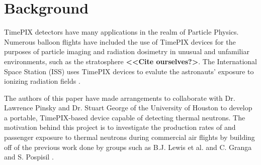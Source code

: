 
\section{Background}
\label{Background}

TimePIX detectors have many applications in the realm of Particle Physics. Numerous balloon flights have included the use of TimePIX devices for the purposes of particle imaging and radiation dosimetry in unusual and unfamiliar environments, such as the stratosphere \cite{bexus} \textbf{<<Cite ourselves?>}. The International Space Station (ISS) uses TimePIX devices to evalute the astronauts' exposure to ionizing radiation fields \cite{timepixiss}.

The authors of this paper have made arrangements to collaborate with Dr. Lawrence Pinsky and Dr. Stuart George of the University of Houston to develop a portable, TimePIX-based device capable of detecting thermal neutrons. The motivation behind this project is to investigate the production rates of and passenger exposure to thermal neutrons during commercial air flights by building off of the previous work done by groups such as B.J. Lewis et al. \cite{aircrewexposure} and C. Granga and S. Pospisil \cite{timepixdosimetry}.
